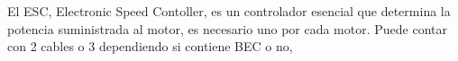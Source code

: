 
 El ESC, Electronic Speed Contoller, es un controlador esencial que determina la potencia suministrada al motor, es necesario uno por cada motor. Puede contar con 2 cables o 3 dependiendo si contiene BEC o no, 
